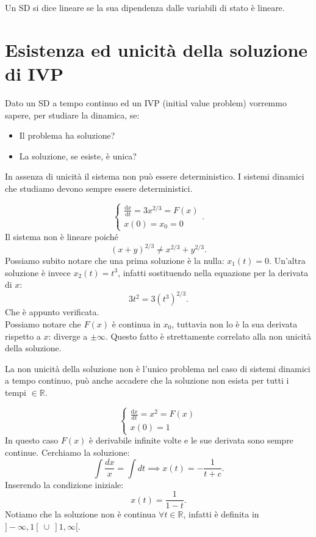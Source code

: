 \noindent
\begin{defn}
    Un SD si dice lineare se la sua dipendenza dalle variabili di stato è lineare.
\end{defn}
\noindent
\section{Esistenza ed unicità della soluzione di IVP}%
\label{sub:Esistenza ed unicità della soluzione di IVP}
Dato un SD a tempo continuo ed un IVP (initial value problem) vorremmo sapere, per studiare la dinamica, se:
\begin{itemize}
    \item Il problema ha soluzione?
    \item La soluzione, se esiste, è unica?
\end{itemize}
In assenza di unicità il sistema non può essere deterministico. I sistemi dinamici che studiamo devono sempre essere deterministici.
\begin{exmp}
    \[
        \begin{cases}
	    \frac{\text{d} x}{\text{d} t} = 3x^{2 /3} = F(x)\\
	    x(0)=x_0=0
        \end{cases}
    .\] 
    Il sistema non è lineare poiché
    \[
        \left(x+y\right)^{2 /3} \neq x^{2 /3}+y^{2 /3}
    .\] 
    Possiamo subito notare che una prima soluzione è la nulla: $x_1(t)=0$.
    Un'altra soluzione è invece $x_2(t)=t^3$, infatti sostituendo nella equazione per la derivata di $x$:
    \[
	3t^2 = 3(t^3)^{2 /3}
    .\] 
    Che è appunto verificata. \\
    Possiamo notare che $F(x)$ è continua in $x_0$, tuttavia non lo è la sua derivata rispetto a $x$: diverge a $\pm \infty$. Questo fatto è strettamente correlato alla non unicità della soluzione.
\end{exmp}
\noindent
La non unicità della soluzione non è l'unico problema nel caso di sistemi dinamici a tempo continuo, può anche accadere che la soluzione non esista per tutti i tempi $\in \mathbb{R}$.
\begin{exmp}
    \[
        \begin{cases}
	    \frac{\text{d} x}{\text{d} t} = x^2=F(x)\\
	    x(0)=1
        \end{cases}
    \] 
    In questo caso $F(x)$ è derivabile infinite volte e le sue derivata sono sempre continue. Cerchiamo la soluzione:
    \[
	\int\frac{dx}{x} = \int  dt \implies  x(t)=-\frac{1}{t+c}
    .\] 
    Inserendo la condizione iniziale:
    \[
	x(t) = \frac{1}{1-t}
    .\] 
    Notiamo che la soluzione non è continua $\forall t \in \mathbb{R}$, infatti è definita in $]-\infty, 1 [ \ \cup \ ]1, \infty[$.
\end{exmp}
